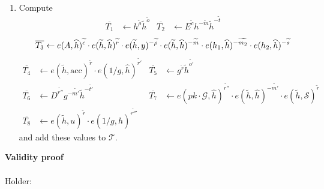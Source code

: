 \documentclass[a4paper]{article}
\begin{document}
\begin{enumerate}
\item Compute
\begin{align}
\overline{T_1}&\leftarrow h^{\widetilde{\rho}} \widetilde{h}^{\widetilde{o}} &
\overline{T_2}&\leftarrow E^{\widetilde{c}}h^{-\widetilde{m}}\widetilde{h}^{-\widetilde{t}}
\end{align}
\begin{equation}
\overline{T_3}\leftarrow e(A,\widehat{h})^{\widetilde{c}}\cdot e(\widetilde{h},\widehat{h})^{\widetilde{r}}\cdot
e(\widetilde{h},y)^{-\widetilde{\rho}}\cdot
e(\widetilde{h},\widehat{h})^{-\widetilde{m}}\cdot
e(h_1,\widehat{h})^{-\widetilde{m_2}}\cdot e(h_2,\widehat{h})^{-\widetilde{s}}\\
\end{equation}
\begin{align}
\overline{T_4}&\leftarrow e(\widetilde{h},\mathrm{acc})^{\widetilde{r}}\cdot
e(1/g,\widehat{h})^{\widetilde{r'}}&
\overline{T_5}&\leftarrow g^{\widetilde{r}}\widetilde{h}^{\widetilde{o'}}\\
\overline{T_6}&\leftarrow D^{\widetilde{r''}}g^{-\widetilde{m'}}
\widetilde{h}^{-\widetilde{t'}}&
\overline{T_7}&\leftarrow e(pk\cdot \mathcal{G},\widehat{h})^{\widetilde{r''}}\cdot
e(\widetilde{h},\widehat{h})^{-\widetilde{m'}}\cdot
e(\widetilde{h},\mathcal{S})^{\widetilde{r}}\\
\overline{T_8}&\leftarrow e(\widetilde{h},u)^{\widetilde{r}}
\cdot e(1/g,\widehat{h})^{\widetilde{r'''}}
\end{align}
and add these values to $\mathcal{T}$.
\end{enumerate}
\textbf{Validity proof}\\
\\Holder:
\end{document}
